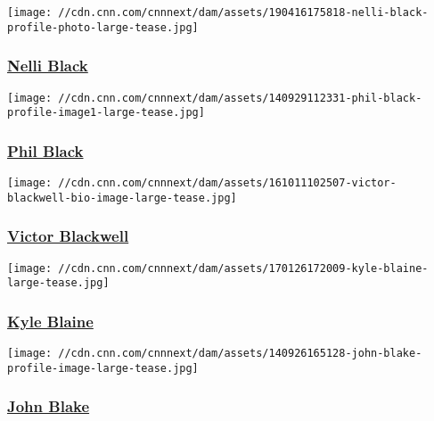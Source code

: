 \href{/profiles/nelli-black}{}

\texttt{[image: //cdn.cnn.com/cnnnext/dam/assets/190416175818-nelli-black-profile-photo-large-tease.jpg]}

\hypertarget{nelli-black}{%
\subsubsection{\texorpdfstring{\href{/profiles/nelli-black}{Nelli
Black}}{Nelli Black}}\label{nelli-black}}

\href{/profiles/phil-black}{}

\texttt{[image: //cdn.cnn.com/cnnnext/dam/assets/140929112331-phil-black-profile-image1-large-tease.jpg]}

\hypertarget{phil-black}{%
\subsubsection{\texorpdfstring{\href{/profiles/phil-black}{Phil
Black}}{Phil Black}}\label{phil-black}}

\href{/profiles/victor-blackwell}{}

\texttt{[image: //cdn.cnn.com/cnnnext/dam/assets/161011102507-victor-blackwell-bio-image-large-tease.jpg]}

\hypertarget{victor-blackwell}{%
\subsubsection{\texorpdfstring{\href{/profiles/victor-blackwell}{Victor
Blackwell}}{Victor Blackwell}}\label{victor-blackwell}}

\href{/profiles/kyle-blaine}{}

\texttt{[image: //cdn.cnn.com/cnnnext/dam/assets/170126172009-kyle-blaine-large-tease.jpg]}

\hypertarget{kyle-blaine}{%
\subsubsection{\texorpdfstring{\href{/profiles/kyle-blaine}{Kyle
Blaine}}{Kyle Blaine}}\label{kyle-blaine}}

\href{/profiles/john-blake}{}

\texttt{[image: //cdn.cnn.com/cnnnext/dam/assets/140926165128-john-blake-profile-image-large-tease.jpg]}

\hypertarget{john-blake}{%
\subsubsection{\texorpdfstring{\href{/profiles/john-blake}{John
Blake}}{John Blake}}\label{john-blake}}

